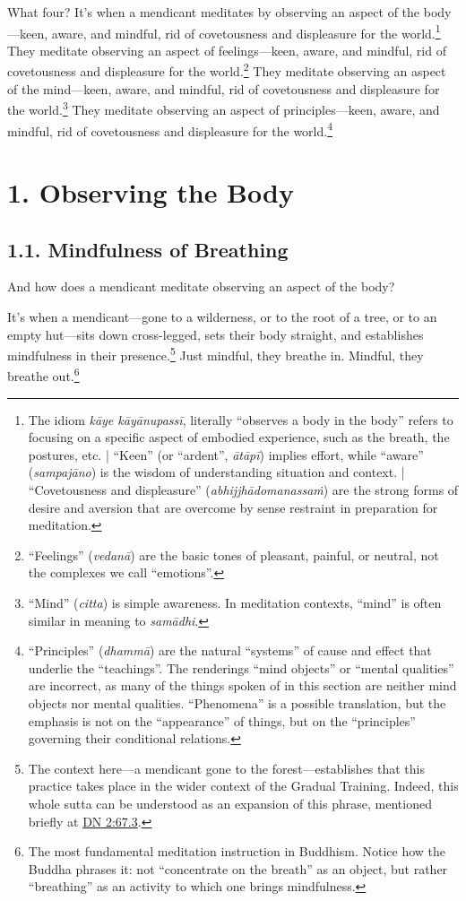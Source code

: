 \documentclass[12pt,openany]{book}%
\begin{document}
What four? It’s when a mendicant meditates by observing an aspect of the body—keen, aware, and mindful, rid of covetousness and displeasure for the world.\footnote{The idiom \textit{\textsanskrit{kāye} \textsanskrit{kāyānupassī}}, literally “observes a body in the body” refers to focusing on a specific aspect of embodied experience, such as the breath, the postures, etc. | “Keen” (or “ardent”, \textit{\textsanskrit{ātāpī}}) implies effort, while “aware” (\textit{\textsanskrit{sampajāno}}) is the wisdom of understanding situation and context. | “Covetousness and displeasure” (\textit{\textsanskrit{abhijjhādomanassaṁ}}) are the strong forms of desire and aversion that are overcome by sense restraint in preparation for meditation. } They meditate observing an aspect of feelings—keen, aware, and mindful, rid of covetousness and displeasure for the world.\footnote{“Feelings” (\textit{\textsanskrit{vedanā}}) are the basic tones of pleasant, painful, or neutral, not the complexes we call “emotions”. } They meditate observing an aspect of the mind—keen, aware, and mindful, rid of covetousness and displeasure for the world.\footnote{“Mind” (\textit{citta}) is simple awareness. In meditation contexts, “mind” is often similar in meaning to \textit{\textsanskrit{samādhi}}. } They meditate observing an aspect of principles—keen, aware, and mindful, rid of covetousness and displeasure for the world.\footnote{“Principles” (\textit{\textsanskrit{dhammā}}) are the natural “systems” of cause and effect that underlie the “teachings”. The renderings “mind objects” or “mental qualities” are incorrect, as many of the things spoken of in this section are neither mind objects nor mental qualities. “Phenomena” is a possible translation, but the emphasis is not on the “appearance” of things, but on the “principles” governing their conditional relations. } 

\section*{1. Observing the Body }

\subsection*{1.1. Mindfulness of Breathing }

And how does a mendicant meditate observing an aspect of the body? 

It’s when a mendicant—gone to a wilderness, or to the root of a tree, or to an empty hut—sits down cross-legged, sets their body straight, and establishes mindfulness in their presence.\footnote{The context here—a mendicant gone to the forest—establishes that this practice takes place in the wider context of the Gradual Training. Indeed, this whole sutta can be understood as an expansion of this phrase, mentioned briefly at \href{https://suttacentral.net/dn2/en/sujato\#67.3}{DN 2:67.3}. } Just mindful, they breathe in. Mindful, they breathe out.\footnote{The most fundamental meditation instruction in Buddhism. Notice how the Buddha phrases it: not “concentrate on the breath” as an object, but rather “breathing” as an activity to which one brings mindfulness. } 
\end{document}
